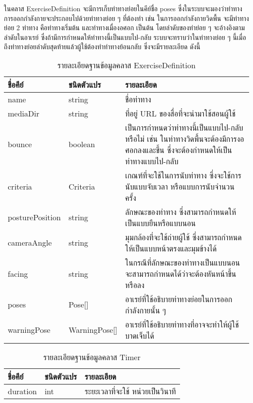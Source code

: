 ในคลาส ExerciseDefinition จะมีการเก็บท่าทางย่อยในคีย์ชื่อ poses ซึ่งในระบบจะมองว่าท่าทางการออกกำลังกายจะประกอบไปด้วยท่าทางย่อย ๆ ที่ต้องทำ เช่น ในการออกกำลังกายวิดพื้น จะมีท่าทางย่อย 2 ท่าทาง คือท่าทางเริ่มต้น และท่าทางเมื่องอศอก เป็นต้น โดยลำดับของท่าย่อย ๆ จะอ้างอิงตามลำดับในอาเรย์ ซึ่งถ้ามีการกำหนดให้ท่าทางนี้เป็นแบบไป-กลับ ระบบจะทราบว่าในท่าทางย่อย ๆ นี้เมื่อถึงท่าทางย่อยลำดับสุดท้ายแล้วผู้ใช้ต้องทำท่าทางย้อนกลับ ซึ่งจะมีรายละเอียด ดังนี้
\begin{table}
    \caption{รายละเอียดฐานข้อมูลคลาส ExerciseDefinition}
    \begin{tabularx}{\textwidth}{ | l | l | X | }
        \hline
        \bf ชื่อคีย์			& \bf ชนิดตัวแปร		& \bf รายละเอียด    \\\hline
        name                & string			& ชื่อท่าทาง           \\\hline
        mediaDir            & string			& ที่อยู่ URL ของสื่อที่จะนำมาใช้สอนผู้ใช้ \\\hline
        bounce              & boolean			& เป็นการกำหนดว่าท่าทางนี้เป็นแบบไป-กลับ หรือไม่ เช่น ในท่าทางวิดพื้นจะต้องมีการงอศอกลงและขึ้น ซึ่งจะต้องกำหนดให้เป็นท่าทางแบบไป-กลับ \\\hline
        criteria			& Criteria			& เกณฑ์ที่จะใช้ในการนับท่าทาง ซึ่งจะใช้การนับแบบจับเวลา หรือแบบการนับจำนวนครั้ง\\\hline
        posturePosition		& string			& ลักษณะของท่าทาง ซึ่งสามารถกำหนดให้เป็นแบบยืนหรือแบบนอน \\\hline
        cameraAngle			& string			& มุมกล้องที่จะใช้ถ่ายผู้ใช้ ซึ่งสามารถกำหนดให้เป็นแบบหน้าตรงและมุมข้างได้\\\hline
        facing				& string			& ในกรณีที่ลักษณะของท่าทางเป็นแบบนอน จะสามารถกำหนดได้ว่าจะต้องหันหน้าขึ้นหรือลง\\\hline
        poses				& Pose[]			& อาเรย์ที่ใช้อธิบายท่าทางย่อยในการออกกำลังกายนั้น ๆ\\\hline
        warningPose			& WarningPose[]		& อาเรย์ที่ใช้อธิบายท่าทางที่อาจจะทำให้ผู้ใช้บาดเจ็บได้\\\hline
    \end{tabularx}
\end{table}


\begin{table}
    \caption{รายละเอียดฐานข้อมูลคลาส Timer}
    \begin{tabularx}{\textwidth}{ | l | l | X | }
        \hline
        \bf ชื่อคีย์			& \bf ชนิดตัวแปร		& \bf รายละเอียด    \\\hline
        duration			& int				& ระยะเวลาที่จะใช้ หน่วยเป็นวินาที\\\hline
    \end{tabularx}
\end{table}

